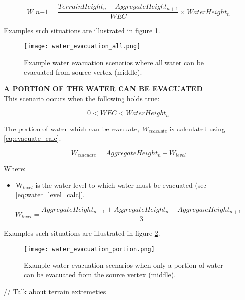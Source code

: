 {\begin{equation}
\textit{W_{n+1}} = \frac{TerrainHeight_{n} - AggregateHeight_{n+1}}{WEC} \times WaterHeight_{n}
\end{equation}

Examples such situations are illustrated in figure \ref{fig:evacuation_all}.

\begin{figure}
\center
	\texttt{[image: water\_evacuation\_all.png]}
	\caption{ Example water evacuation scenarios where all water can be evacuated from source vertex (middle).}
	\label{fig:evacuation_all}
\end{figure}

\textbf{A PORTION OF THE WATER CAN BE EVACUATED}\\

This scenario occurs when the following holds true:

\begin{equation}
	0 < WEC < WaterHeight_{n}
\end{equation}

The portion of water which can be evacuate, \textit{W$_{evacuate}$} is calculated using \ref{eq:evacuate_calc}. 

\begin{equation}\label{eq:evacuate_calc}
	W_{evacuate} = AggregateHeight_{n} - W_{level}
\end{equation}

Where:
\begin{itemize}
 \item W$_{level}$ is the water level to which water must be evacuated (see \ref{eq:water_level_calc}).
\end{itemize}

\begin{equation} \label{eq:water_level_calc}
	W_{level} = \frac{AggregateHeight_{n-1} + AggregateHeight_{n} + AggregateHeight_{n+1}}{3}
\end{equation}

Examples such situations are illustrated in figure \ref{fig:evacuation_portion}.

\begin{figure}
\center
	\texttt{[image: water\_evacuation\_portion.png]}
	\caption{ Example water evacuation scenarios when only a portion of water can be evacuated from the source vertex (middle).}
	\label{fig:evacuation_portion}
\end{figure}

// Talk about terrain extremeties

}
